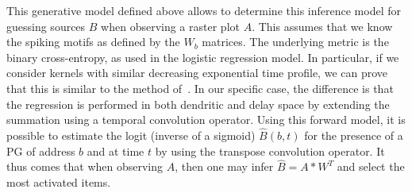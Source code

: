 \documentclass[default]{sn-jnl}%
\theoremstyle{thmstyleone}%
\theoremstyle{thmstyletwo}%
\theoremstyle{thmstylethree}%
\newcommand{\note}[1]{{\sethlcolor{yellow}\hl{#1}}}
\begin{document}
%
%
%
%
%
%
%
%

% 
This generative model defined above allows to determine this inference model for guessing sources $B$ when observing a raster plot $A$. This assumes that we know the spiking motifs as defined by the $W_b$ matrices. The underlying metric is the binary cross-entropy, as used in the logistic regression model. In particular, if we consider kernels with similar decreasing exponential time profile, we can prove that this is similar to the method of~\citet{berens_fast_2012}. In our specific case, the difference is that the regression is performed in both dendritic and delay space by extending the summation using a temporal convolution operator. Using this forward model, it is possible to estimate the logit (inverse of a sigmoid) $\hat{B}(b, t)$ for the presence of a PG of address $b$ and at time $t$ by using the transpose convolution operator. It thus comes that when observing $A$, then one may infer $\hat{B} = A \ast W^T$ and select the most activated items. 
\end{document}
